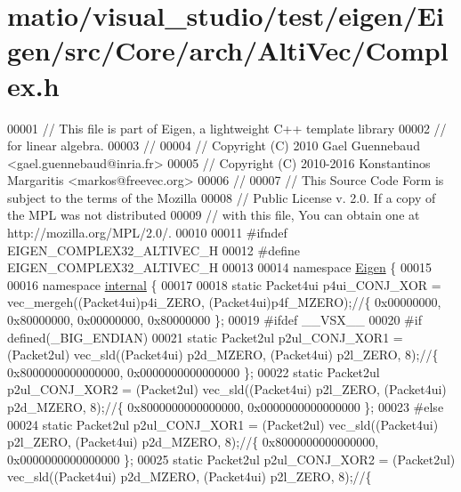\hypertarget{matio_2visual__studio_2test_2eigen_2_eigen_2src_2_core_2arch_2_alti_vec_2_complex_8h_source}{}\section{matio/visual\+\_\+studio/test/eigen/\+Eigen/src/\+Core/arch/\+Alti\+Vec/\+Complex.h}
\label{matio_2visual__studio_2test_2eigen_2_eigen_2src_2_core_2arch_2_alti_vec_2_complex_8h_source}

\begin{DoxyCode}
00001 \textcolor{comment}{// This file is part of Eigen, a lightweight C++ template library}
00002 \textcolor{comment}{// for linear algebra.}
00003 \textcolor{comment}{//}
00004 \textcolor{comment}{// Copyright (C) 2010 Gael Guennebaud <gael.guennebaud@inria.fr>}
00005 \textcolor{comment}{// Copyright (C) 2010-2016 Konstantinos Margaritis <markos@freevec.org>}
00006 \textcolor{comment}{//}
00007 \textcolor{comment}{// This Source Code Form is subject to the terms of the Mozilla}
00008 \textcolor{comment}{// Public License v. 2.0. If a copy of the MPL was not distributed}
00009 \textcolor{comment}{// with this file, You can obtain one at http://mozilla.org/MPL/2.0/.}
00010 
00011 \textcolor{preprocessor}{#ifndef EIGEN\_COMPLEX32\_ALTIVEC\_H}
00012 \textcolor{preprocessor}{#define EIGEN\_COMPLEX32\_ALTIVEC\_H}
00013 
00014 \textcolor{keyword}{namespace }\hyperlink{namespace_eigen}{Eigen} \{
00015 
00016 \textcolor{keyword}{namespace }\hyperlink{namespaceinternal}{internal} \{
00017 
00018 \textcolor{keyword}{static} Packet4ui  p4ui\_CONJ\_XOR = vec\_mergeh((Packet4ui)p4i\_ZERO, (Packet4ui)p4f\_MZERO);\textcolor{comment}{//\{ 0x00000000,
       0x80000000, 0x00000000, 0x80000000 \};}
00019 \textcolor{preprocessor}{#ifdef \_\_VSX\_\_}
00020 \textcolor{preprocessor}{#if defined(\_BIG\_ENDIAN)}
00021 \textcolor{keyword}{static} Packet2ul  p2ul\_CONJ\_XOR1 = (Packet2ul) vec\_sld((Packet4ui) p2d\_MZERO, (Packet4ui) p2l\_ZERO, 8);\textcolor{comment}{//\{
       0x8000000000000000, 0x0000000000000000 \};}
00022 \textcolor{keyword}{static} Packet2ul  p2ul\_CONJ\_XOR2 = (Packet2ul) vec\_sld((Packet4ui) p2l\_ZERO,  (Packet4ui) p2d\_MZERO, 8);\textcolor{comment}{//\{
       0x8000000000000000, 0x0000000000000000 \};}
00023 \textcolor{preprocessor}{#else}
00024 \textcolor{keyword}{static} Packet2ul  p2ul\_CONJ\_XOR1 = (Packet2ul) vec\_sld((Packet4ui) p2l\_ZERO,  (Packet4ui) p2d\_MZERO, 8);\textcolor{comment}{//\{
       0x8000000000000000, 0x0000000000000000 \};}
00025 \textcolor{keyword}{static} Packet2ul  p2ul\_CONJ\_XOR2 = (Packet2ul) vec\_sld((Packet4ui) p2d\_MZERO, (Packet4ui) p2l\_ZERO, 8);\textcolor{comment}{//\{
}
\end{DoxyCode}
